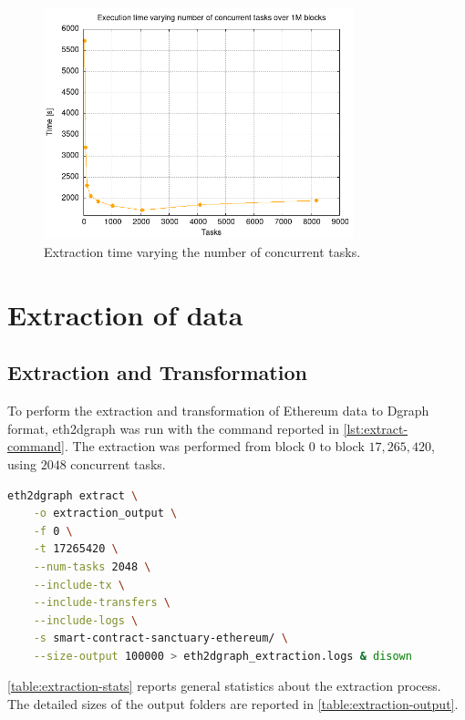 \begin{figure}[H]
    \centering
    \includegraphics[width=0.8\textwidth]{Figures/results/num-tasks.png}
    \caption{Extraction time varying the number of concurrent tasks.}
    \label{fig:num-tasks}
\end{figure}

\section{Extraction of data}

\subsection{Extraction and Transformation}

To perform the extraction and transformation of Ethereum data to Dgraph format, eth2dgraph was run with the command reported in \cref{lst:extract-command}. The extraction was performed from block $0$ to block $17,265,420$, using $2048$ concurrent tasks. 

\begin{lstlisting}[language=Bash,caption={Eth2dgraph extraction command used.},label={lst:extract-command},captionpos=b,numbers=none]
eth2dgraph extract \
    -o extraction_output \
    -f 0 \
    -t 17265420 \
    --num-tasks 2048 \
    --include-tx \
    --include-transfers \
    --include-logs \
    -s smart-contract-sanctuary-ethereum/ \
    --size-output 100000 > eth2dgraph_extraction.logs & disown
\end{lstlisting}

\cref{table:extraction-stats} reports general statistics about the extraction process. The detailed sizes of the output folders are reported in \cref{table:extraction-output}.

